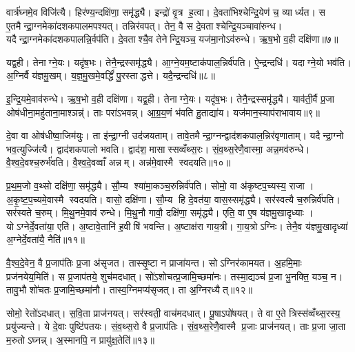वार्त्र॑घ्नमे॒व विजि॑त्यै। हिर॑ण्य॒न्दक्षि॑णा॒ समृ॑द्ध्यै। इन्द्रो॑ वृ॒त्र ह॒त्वा। दे॒वता॑भिश्चेन्द्रि॒येण॑ च॒ व्यार्ध्यत। स ए॒तमैन्द्रा॒ग्नमेका॑दशकपालमपश्यत्। तन्निर॑वपत्। तेन॒ वै स दे॒वताश्चेन्द्रि॒यञ्चावा॑रुन्ध। यदैन्द्रा॒ग्नमेका॑दशकपालन्नि॒र्वप॑ति। दे॒वताश्चै॒व तेनेन्द्रि॒यञ्च॒ यज॑मा॒नोऽव॑रुन्धे। ऋ॒ष॒भो व॒ही दक्षि॑णा॥७॥

यद्व॒ही। तेनाग्ने॒यः। यदृ॑ष॒भः। तेनै॒न्द्रस्समृ॑द्ध्यै। आ॒ग्ने॒यम॒ष्टाक॑पाल॒न्निर्व॑पति। ऐ॒न्द्रन्दधि॑। यदाग्ने॒यो भव॑ति। अ॒ग्निर्वै य॑ज्ञमु॒खम्। य॒ज्ञ॒मु॒खमे॒वर्द्धिं॑ पु॒रस्ताद्धत्ते। यदै॒न्द्रन्दधि॑॥८॥

इ॒न्द्रि॒यमे॒वाव॑रुन्धे। ऋ॒ष॒भो व॒ही दक्षि॑णा। यद्व॒ही। तेनाग्ने॒यः। यदृ॑ष॒भः। तेनै॒न्द्रस्समृ॑द्ध्यै। याव॑ती॒र्वै प्र॒जा ओष॑धीना॒महु॑ताना॒माश्ञन्न्॑। ताः परा॑ऽभवन्न्। आ॒ग्र॒य॒णं भ॑वति हु॒ताद्या॑य। यज॑मान॒स्याप॑राभावाय॥९॥

दे॒वा वा ओष॑धीष्वा॒जिम॑युः। ता इ॑न्द्रा॒ग्नी उद॑जयताम्। तावे॒तमैन्द्रा॒ग्नन्द्वाद॑शकपाल॒न्निर॑वृणाताम्। यदैन्द्रा॒ग्नो भव॒त्युज्जि॑त्यै। द्वाद॑शकपालो भवति। द्वाद॑श॒ मासास्सव्वँथ्स॒रः। सं॒व॒थ्स॒रेणै॒वास्मा॒ अन्न॒मव॑रुन्धे। वै॒श्व॒दे॒वश्च॒रुर्भ॑वति। वै॒श्व॒दे॒वव्वाँ अन्नम्। अन्न॑मे॒वास्मै स्वदयति॥१०॥

प्र॒थ॒म॒जो व॒थ्सो दक्षि॑णा॒ समृ॑द्ध्यै। सौ॒म्य श्या॑मा॒कञ्च॒रुन्निर्व॑पति। सोमो॒ वा अ॑कृष्टप॒च्यस्य॒ राजा। अ॒कृ॒ष्ट॒प॒च्यमे॒वास्मै स्वदयति। वासो॒ दक्षि॑णा। सौ॒म्य हि दे॒वत॑या॒ वास॒स्समृ॑द्ध्यै। सर॑स्वत्यै च॒रुन्निर्व॑पति। सर॑स्वते च॒रुम्। मि॒थु॒नमे॒वाव॑ रुन्धे। मि॒थु॒नौ गावौ॒ दक्षि॑णा॒ समृ॑द्ध्यै। एति॒ वा ए॒ष य॑ज्ञमु॒खादृध्याः। योऽग्नेर्दे॒वता॑या॒ एति॑। अ॒ष्टावे॒तानि॑ ह॒वीषि॑ भवन्ति। अ॒ष्टाक्ष॑रा गाय॒त्री। गा॒य॒त्रोऽग्निः। तेनै॒व य॑ज्ञमु॒खादृध्या॑ अ॒ग्नेर्दे॒वता॑यै॒ नैति॑॥११॥

वै॒श्व॒दे॒वेन॒ वै प्र॒जाप॑तिः प्र॒जा अ॑सृजत। तास्सृ॒ष्टा न प्राजा॑यन्त। सोऽग्निर॑कामयत। अ॒हमि॒माः प्रज॑नयेय॒मिति॑। स प्र॒जाप॑तये॒ शुच॑मदधात्। सो॑ऽशोचत्प्र॒जामि॒च्छमा॑नः। तस्मा॒द्यञ्च॑ प्र॒जा भु॒नक्ति॒ यञ्च॒ न। तावु॒भौ शो॑चतः प्र॒जामि॒च्छमा॑नौ। तास्व॒ग्निमप्य॑सृजत्। ता अ॒ग्निरध्यैत्॥१२॥

सोमो॒ रेतो॑ऽदधात्। स॒वि॒ता प्राज॑नयत्। सर॑स्वती॒ वाच॑मदधात्। पू॒षाऽपो॑षयत्। ते वा ए॒ते त्रिस्स॑व्वँथ्स॒रस्य॒ प्रयु॑ज्यन्ते। ये दे॒वाः पुष्टि॑पतयः। सं॒व॒थ्स॒रो वै प्र॒जाप॑तिः। सं॒व॒थ्स॒रेणै॒वास्मै प्र॒जाः प्राज॑नयत्। ताः प्र॒जा जा॒ता म॒रुतोऽघ्नन्न्। अ॒स्मानपि॒ न प्रायु॑क्ष॒तेति॑॥१३॥

